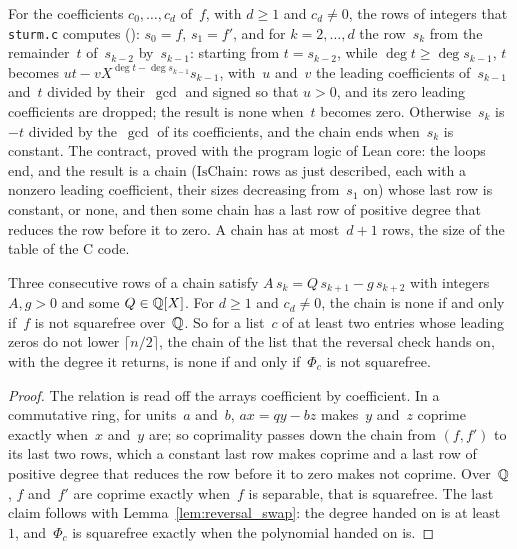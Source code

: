 \begin{definition}\label{def:remainderChain}
  \leanok
  For the coefficients $c_0, \dots, c_d$ of~$f$, with $d \ge 1$ and $c_d \ne 0$, the rows of
  integers that \verb|sturm.c| computes (): $s_0 = f$, $s_1 = f'$, and for
  $k = 2, \dots, d$ the row~$s_k$ from the remainder~$t$ of~$s_{k-2}$ by~$s_{k-1}$: starting from
  $t = s_{k-2}$, while $\deg t \ge \deg s_{k-1}$, $t$ becomes
  $u t - v X^{\deg t - \deg s_{k-1}} s_{k-1}$, with~$u$ and~$v$ the leading coefficients
  of~$s_{k-1}$ and~$t$ divided by their~$\gcd$ and signed so that $u > 0$, and its zero leading
  coefficients are dropped; the result is none when~$t$ becomes zero. Otherwise~$s_k$ is~$-t$
  divided by the~$\gcd$ of its coefficients, and the chain ends when~$s_k$ is constant. The
  contract, proved with the program logic of Lean core: the loops end, and the result is a chain
  ($\mathrm{IsChain}$: rows as just described, each with a nonzero leading coefficient, their sizes
  decreasing from~$s_1$ on) whose last row is constant, or none, and then some chain has a last row
  of positive degree that reduces the row before it to zero. A chain has at most~$d + 1$ rows, the
  size of the table of the C code.
\end{definition}

\begin{lemma}\label{lem:chain_squarefree}
  \leanok
  Three consecutive rows of a chain satisfy $A\, s_k = Q\, s_{k+1} - g\, s_{k+2}$ with integers
  $A, g > 0$ and some $Q \in \mathbb{Q}[X]$. For $d \ge 1$ and $c_d \ne 0$, the chain is none if and only
  if~$f$ is not squarefree over~$\mathbb{Q}$. So for a list~$c$ of at least two entries whose leading zeros
  do not lower $\lceil n/2 \rceil$, the chain of the list that the reversal check hands on, with the
  degree it returns, is none if and only if~$\Phi_c$ is not squarefree.
\end{lemma}

\begin{proof}
  \leanok
  The relation is read off the arrays coefficient by coefficient. In a commutative ring, for
  units~$a$ and~$b$, $a x = q y - b z$ makes~$y$ and~$z$ coprime exactly when~$x$ and~$y$ are; so
  coprimality passes down the chain from $(f, f')$ to its last two rows, which a constant last row
  makes coprime and a last row of positive degree that reduces the row before it to zero makes not
  coprime. Over~$\mathbb{Q}$, $f$ and~$f'$ are coprime exactly when~$f$ is separable, that is squarefree.
  The last claim follows with Lemma~\ref{lem:reversal_swap}: the degree handed on is at least~$1$,
  and~$\Phi_c$ is squarefree exactly when the polynomial handed on is.
\end{proof}

